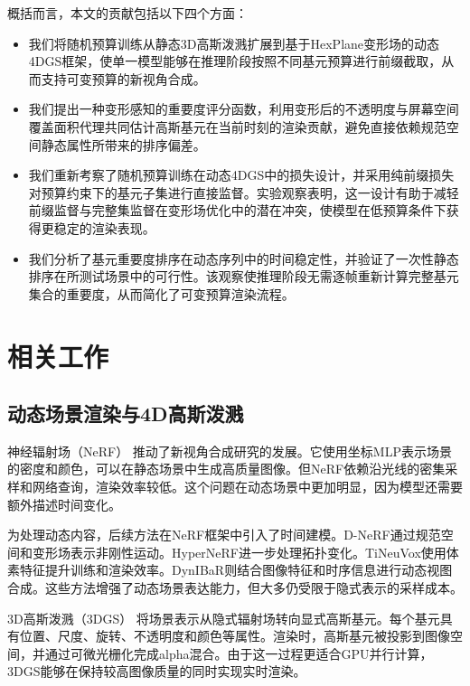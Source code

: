 \documentclass[sn-mathphys]{sn-jnl}
\begin{document}
概括而言，本文的贡献包括以下四个方面：

\begin{itemize}
    \item 我们将随机预算训练从静态3D高斯泼溅扩展到基于HexPlane变形场的动态4DGS框架，使单一模型能够在推理阶段按照不同基元预算进行前缀截取，从而支持可变预算的新视角合成。
    \item 我们提出一种变形感知的重要度评分函数，利用变形后的不透明度与屏幕空间覆盖面积代理共同估计高斯基元在当前时刻的渲染贡献，避免直接依赖规范空间静态属性所带来的排序偏差。
    \item 我们重新考察了随机预算训练在动态4DGS中的损失设计，并采用纯前缀损失对预算约束下的基元子集进行直接监督。实验观察表明，这一设计有助于减轻前缀监督与完整集监督在变形场优化中的潜在冲突，使模型在低预算条件下获得更稳定的渲染表现。
    \item 我们分析了基元重要度排序在动态序列中的时间稳定性，并验证了一次性静态排序在所测试场景中的可行性。该观察使推理阶段无需逐帧重新计算完整基元集合的重要度，从而简化了可变预算渲染流程。
\end{itemize}

\section{相关工作}
\label{sec:related}

\subsection{动态场景渲染与4D高斯泼溅}

神经辐射场（NeRF）\cite{mildenhall2020nerf} 推动了新视角合成研究的发展。它使用坐标MLP表示场景的密度和颜色，可以在静态场景中生成高质量图像。但NeRF依赖沿光线的密集采样和网络查询，渲染效率较低。这个问题在动态场景中更加明显，因为模型还需要额外描述时间变化。

为处理动态内容，后续方法在NeRF框架中引入了时间建模。D-NeRF通过规范空间和变形场表示非刚性运动。HyperNeRF进一步处理拓扑变化。TiNeuVox使用体素特征提升训练和渲染效率。DynIBaR则结合图像特征和时序信息进行动态视图合成。这些方法增强了动态场景表达能力，但大多仍受限于隐式表示的采样成本。

3D高斯泼溅（3DGS）\cite{kerbl20233dgaussians} 将场景表示从隐式辐射场转向显式高斯基元。每个基元具有位置、尺度、旋转、不透明度和颜色等属性。渲染时，高斯基元被投影到图像空间，并通过可微光栅化完成alpha混合。由于这一过程更适合GPU并行计算，3DGS能够在保持较高图像质量的同时实现实时渲染。
\end{document}
